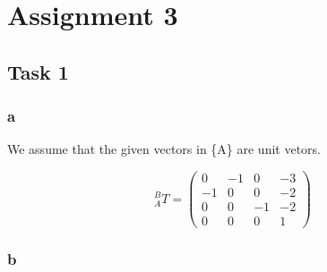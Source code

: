 \chapter{Assignment 3}\label{ass3}

\section{Task 1}\label{ass3_t1}

\subsection{a}\label{ass3_t1_a}

We assume that the given vectors in \{A\} are unit vetors.

\begin{equation}
  ^{B}_{A}T
  =
  \begin{pmatrix}
    0   & -1  & 0   & -3  \\
    -1  & 0   & 0   & -2  \\
    0   & 0   & -1  & -2  \\
    0   & 0   & 0   & 1
  \end{pmatrix}
\end{equation}

\subsection{b}\label{ass3_t1_b}

